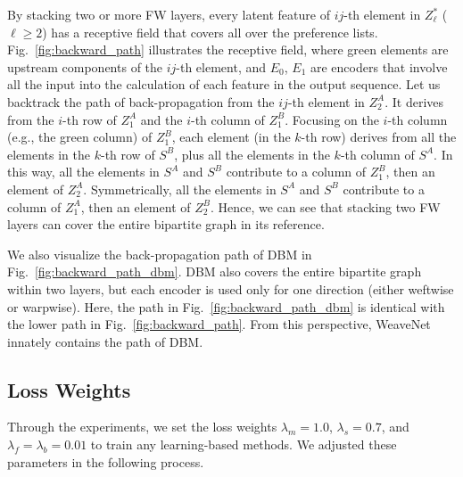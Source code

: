 By stacking two or more FW layers, every latent feature of $ij$-th element in $Z^*_\ell$ ($\ell\geq 2$) has a receptive field that covers all over the preference lists.
Fig.~\ref{fig:backward_path} illustrates the receptive field, where green elements are upstream components of the $ij$-th element, and $E_0$, $E_1$ are encoders that involve all the input into the calculation of each feature in the output sequence. 
Let us backtrack the path of back-propagation from the $ij$-th element in $Z^A_2$.
It derives from the $i$-th row of $Z^A_1$ and the $i$-th column of $Z^B_1$.
Focusing on the $i$-th column (e.g., the green column) of $Z^B_1$, each element (in the $k$-th row) derives from all the elements in the $k$-th row of $S^B$, plus all the elements in the $k$-th column of $S^A$.
In this way, all the elements in $S^A$ and $S^B$ contribute to a column of $Z^B_1$, then an element of $Z^A_2$.
Symmetrically, all the elements in $S^A$ and $S^B$ contribute to a column of $Z^A_1$, then an element of $Z^B_2$.
Hence, we can see that stacking two FW layers can cover the entire bipartite graph in its reference.




We also visualize the back-propagation path of DBM in Fig.~\ref{fig:backward_path_dbm}.
DBM also covers the entire bipartite graph within two layers, but each encoder is used only for one direction (either weftwise or warpwise). Here, the path in Fig.~\ref{fig:backward_path_dbm} is identical with the lower path in Fig.~\ref{fig:backward_path}. From this perspective, WeaveNet innately contains the path of DBM.

\subsection{Loss Weights}\label{app:hyperparameters}


Through the experiments, we set the loss weights $\lambda_m=1.0$, $\lambda_s=0.7$, and $\lambda_f=\lambda_b=0.01$ to train any learning-based methods.
We adjusted these parameters in the following process.

